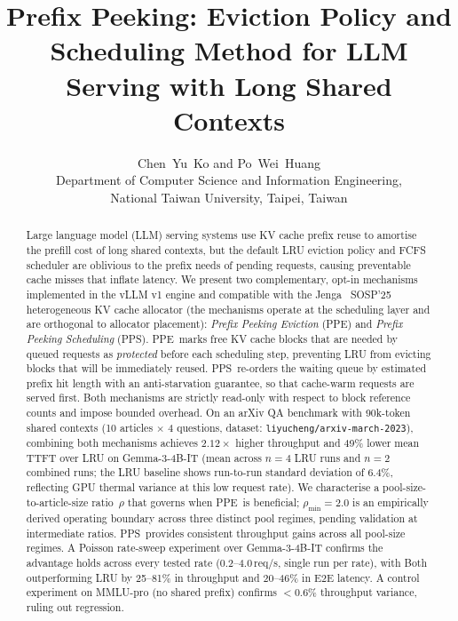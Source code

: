 \documentclass[journal]{IEEEtran}
\newcommand{\ppe}{\textsc{PPE}}
\newcommand{\pps}{\textsc{PPS}}
\newcommand{\rhomin}{\rho_{\min}}
\newcommand{\jenga}{Jenga}
\begin{document}
\title{Prefix Peeking: Eviction Policy and Scheduling Method for LLM Serving with Long Shared Contexts}

\author{Chen~Yu~Ko and Po~Wei~Huang\\
        Department of Computer Science and Information Engineering,\\
        National Taiwan University, Taipei, Taiwan}

\maketitle

\begin{abstract}
Large language model (LLM) serving systems use KV cache prefix reuse to
amortise the prefill cost of long shared contexts, but the default LRU
eviction policy and FCFS scheduler are oblivious to the prefix needs of
pending requests, causing preventable cache misses that inflate latency.
We present two complementary, opt-in mechanisms implemented in the vLLM v1
engine and compatible with the \jenga~\cite{jenga2025} SOSP'25 heterogeneous
KV cache allocator (the mechanisms operate at the scheduling layer and are
orthogonal to allocator placement):
\emph{Prefix Peeking Eviction} (\ppe) and \emph{Prefix Peeking Scheduling}
(\pps).
\ppe\ marks free KV cache blocks that are needed by queued requests as
\emph{protected} before each scheduling step, preventing LRU from evicting
blocks that will be immediately reused.
\pps\ re-orders the waiting queue by estimated prefix hit length with an
anti-starvation guarantee, so that cache-warm requests are served first.
Both mechanisms are strictly read-only with respect to block reference counts
and impose bounded overhead.
On an arXiv QA benchmark with 90k-token shared contexts (10 articles
$\times$ 4 questions, dataset: \texttt{liyucheng/arxiv-march-2023}),
combining both mechanisms achieves $2.12\times$ higher throughput and 49\%
lower mean TTFT over LRU on Gemma-3-4B-IT (mean across $n=4$ LRU runs and
$n=2$ combined runs; the LRU baseline shows run-to-run standard deviation of
6.4\%, reflecting GPU thermal variance at this low request rate).
We characterise a pool-size-to-article-size ratio~$\rho$ that governs
when \ppe\ is beneficial; $\rhomin=2.0$ is an empirically derived operating
boundary across three distinct pool regimes, pending validation at
intermediate ratios.
\pps\ provides consistent throughput gains across all pool-size regimes.
A Poisson rate-sweep experiment over Gemma-3-4B-IT confirms the advantage
holds across every tested rate (0.2--4.0\,req/s, single run per rate), with
Both outperforming LRU by 25--81\% in throughput and 20--46\% in E2E latency.
A control experiment on MMLU-pro (no shared prefix) confirms $<0.6\%$
throughput variance, ruling out regression.
\end{abstract}
\end{document}
